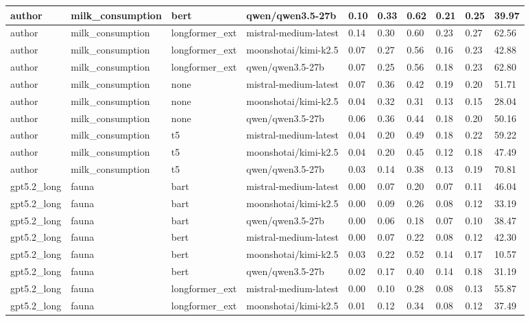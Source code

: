 \begin{tabular}{|l|l|l|l|l|l|l|l|l|l|}
 \hline
 author & milk\_consumption & bert & qwen/qwen3.5-27b & 0.10 & 0.33 & 0.62 & 0.21 & 0.25 & 39.97 \\
 \hline
 author & milk\_consumption & longformer\_ext & mistral-medium-latest & 0.14 & 0.30 & 0.60 & 0.23 & 0.27 & 62.56 \\
 \hline
 author & milk\_consumption & longformer\_ext & moonshotai/kimi-k2.5 & 0.07 & 0.27 & 0.56 & 0.16 & 0.23 & 42.88 \\
 \hline
 author & milk\_consumption & longformer\_ext & qwen/qwen3.5-27b & 0.07 & 0.25 & 0.56 & 0.18 & 0.23 & 62.80 \\
 \hline
 author & milk\_consumption & none & mistral-medium-latest & 0.07 & 0.36 & 0.42 & 0.19 & 0.20 & 51.71 \\
 \hline
 author & milk\_consumption & none & moonshotai/kimi-k2.5 & 0.04 & 0.32 & 0.31 & 0.13 & 0.15 & 28.04 \\
 \hline
 author & milk\_consumption & none & qwen/qwen3.5-27b & 0.06 & 0.36 & 0.44 & 0.18 & 0.20 & 50.16 \\
 \hline
 author & milk\_consumption & t5 & mistral-medium-latest & 0.04 & 0.20 & 0.49 & 0.18 & 0.22 & 59.22 \\
 \hline
 author & milk\_consumption & t5 & moonshotai/kimi-k2.5 & 0.04 & 0.20 & 0.45 & 0.12 & 0.18 & 47.49 \\
 \hline
 author & milk\_consumption & t5 & qwen/qwen3.5-27b & 0.03 & 0.14 & 0.38 & 0.13 & 0.19 & 70.81 \\
 \hline
 gpt5.2\_long & fauna & bart & mistral-medium-latest & 0.00 & 0.07 & 0.20 & 0.07 & 0.11 & 46.04 \\
 \hline
 gpt5.2\_long & fauna & bart & moonshotai/kimi-k2.5 & 0.00 & 0.09 & 0.26 & 0.08 & 0.12 & 33.19 \\
 \hline
 gpt5.2\_long & fauna & bart & qwen/qwen3.5-27b & 0.00 & 0.06 & 0.18 & 0.07 & 0.10 & 38.47 \\
 \hline
 gpt5.2\_long & fauna & bert & mistral-medium-latest & 0.00 & 0.07 & 0.22 & 0.08 & 0.12 & 42.30 \\
 \hline
 gpt5.2\_long & fauna & bert & moonshotai/kimi-k2.5 & 0.03 & 0.22 & 0.52 & 0.14 & 0.17 & 10.57 \\
 \hline
 gpt5.2\_long & fauna & bert & qwen/qwen3.5-27b & 0.02 & 0.17 & 0.40 & 0.14 & 0.18 & 31.19 \\
 \hline
 gpt5.2\_long & fauna & longformer\_ext & mistral-medium-latest & 0.00 & 0.10 & 0.28 & 0.08 & 0.13 & 55.87 \\
 \hline
 gpt5.2\_long & fauna & longformer\_ext & moonshotai/kimi-k2.5 & 0.01 & 0.12 & 0.34 & 0.08 & 0.12 & 37.49 \\

\end{tabular}
